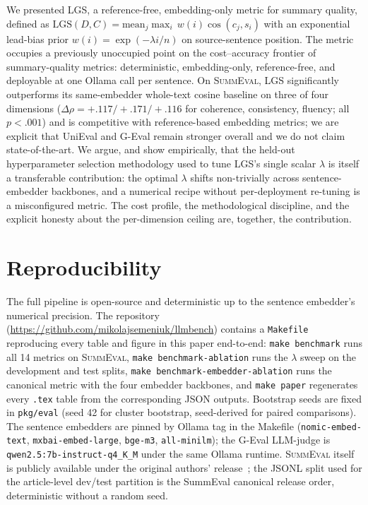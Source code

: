 \documentclass[journal]{IEEEtran}
\begin{document}
We presented LGS, a reference-free, embedding-only metric for
summary quality, defined as
$\mathrm{LGS}(D,C){=}\mathrm{mean}_j \max_i\, w(i)\cos(c_j, s_i)$
with an exponential lead-bias prior $w(i){=}\exp(-\lambda i / n)$
on source-sentence position. The metric occupies a previously
unoccupied point on the cost--accuracy frontier of summary-quality
metrics: deterministic, embedding-only, reference-free, and
deployable at one Ollama call per sentence. On
\textsc{SummEval}, LGS significantly outperforms its same-embedder
whole-text cosine baseline on three of four dimensions
($\Delta\rho{=}+.117/{+}.171/{+}.116$ for coherence, consistency,
fluency; all $p<.001$) and is competitive with reference-based
embedding metrics; we are explicit that UniEval and G-Eval remain
stronger overall and we do not claim state-of-the-art. We argue,
and show empirically, that the held-out hyperparameter selection
methodology used to tune LGS's single scalar $\lambda$ is itself
a transferable contribution: the optimal $\lambda$ shifts
non-trivially across sentence-embedder backbones, and a numerical
recipe without per-deployment re-tuning is a misconfigured
metric. The cost profile, the methodological discipline, and the
explicit honesty about the per-dimension ceiling are, together,
the contribution.

\section*{Reproducibility}
\label{sec:repro}
The full pipeline is open-source and deterministic up to the
sentence embedder's numerical precision. The repository
(\url{https://github.com/mikolajsemeniuk/llmbench}) contains a
\texttt{Makefile} reproducing every table and figure in this
paper end-to-end: \texttt{make benchmark} runs all 14 metrics on
\textsc{SummEval}, \texttt{make benchmark-ablation} runs the
$\lambda$ sweep on the development and test splits,
\texttt{make benchmark-embedder-ablation} runs the canonical
metric with the four embedder backbones, and \texttt{make paper}
regenerates every \texttt{.tex} table from the corresponding
JSON outputs. Bootstrap seeds are fixed in \texttt{pkg/eval}
(seed 42 for cluster bootstrap, seed-derived for paired
comparisons). The sentence embedders are pinned by Ollama tag in
the Makefile (\texttt{nomic-embed-text},
\texttt{mxbai-embed-large}, \texttt{bge-m3}, \texttt{all-minilm});
the G-Eval LLM-judge is \texttt{qwen2.5:7b-instruct-q4\_K\_M}
under the same Ollama runtime. \textsc{SummEval} itself is
publicly available under the original authors'
release~\cite{fabbri2021summeval}; the JSONL split used for the
article-level dev/test partition is the SummEval canonical
release order, deterministic without a random seed.
\end{document}
